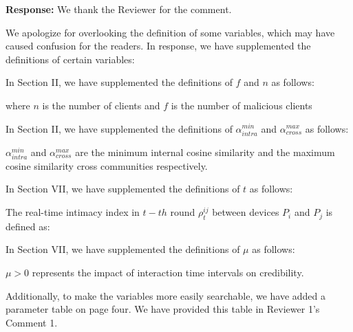 \documentclass[a4paper,twoside,11pt,dvipsnames]{reviewresponse}
\begin{document}
\textbf{Response:} We thank the Reviewer for the comment. 

We apologize for overlooking the definition of some variables, which may have caused confusion for the readers. In response, we have supplemented the definitions of certain variables:

In Section II, we have supplemented the definitions of $f$ and $n$ as follows:

\color{blue} where $n$ is the number of clients and $f$ is the number of malicious clients\color{black}

In Section II, we have supplemented the definitions of $\alpha^{min}_{intra}$ and  $\alpha^{max}_{cross}$ as follows:

\color{blue}$\alpha^{min}_{intra}$ and  $\alpha^{max}_{cross}$ are the minimum internal cosine similarity and the maximum cosine similarity cross communities respectively.\color{black}

In Section VII, we have supplemented the definitions of $t$ as follows:

\color{blue}The real-time intimacy index in $t-th$ round  $\rho^{ij}_t$ between devices $P_i$ and $P_j$ is defined as:
\color{black}

In Section VII, we have supplemented the definitions of $\mu$ as follows:

\color{blue}$\mu> 0$ represents the impact of interaction time intervals on credibility.\color{black}

Additionally, to make the variables more easily searchable, we have added a parameter table on page four. We have provided this table in Reviewer 1's Comment 1. 


\end{document}
